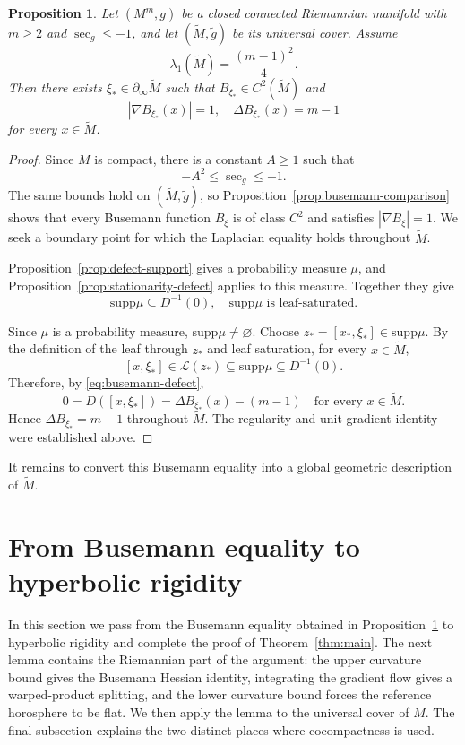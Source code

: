 \documentclass[12pt]{amsart}
\newtheorem{proposition}[theorem]{Proposition}
\theoremstyle{definition}
\numberwithin{equation}{section}
\newcommand{\mc}{\mathcal}
\newcommand{\wti}{\widetilde}
\newcommand{\supp}{\mathrm{supp}}
\begin{document}
\begin{proposition}
\label{prop:equality-busemann}
Let \((M^m,g)\) be a closed connected Riemannian manifold with \(m\geq2\)
and \(\sec_g\leq-1\), and let \((\wti M,\wti g)\) be its universal cover.
Assume
\[
  \lambda_1(\wti M)=\frac{(m-1)^2}{4}.
\]
Then there exists \(\xi_*\in\partial_\infty\wti M\) such that
\(B_{\xi_*}\in C^2(\wti M)\) and
\[
  |\nabla B_{\xi_*}(x)|=1,
  \quad
  \Delta B_{\xi_*}(x)=m-1
\]
for every \(x\in\wti M\).
\end{proposition}

\begin{proof}
Since \(M\) is compact, there is a constant \(A\geq1\) such that
\[
  -A^2\leq\sec_g\leq-1.
\]
The same bounds hold on \((\wti M,\wti g)\), so
Proposition~\ref{prop:busemann-comparison} shows that every Busemann
function \(B_\xi\) is of class \(C^2\) and satisfies
\(|\nabla B_\xi|=1\).  We seek a boundary point for which the Laplacian
equality holds throughout \(\wti M\).

Proposition~\ref{prop:defect-support} gives a probability measure
\(\mu\), and Proposition~\ref{prop:stationarity-defect} applies to this
measure.  Together they give
\[
  \supp\mu\subseteq D^{-1}(0),
  \quad
  \supp\mu\text{ is leaf-saturated}.
\]

Since \(\mu\) is a probability measure, \(\supp\mu\neq\varnothing\).
Choose \(z_*=[x_*,\xi_*]\in\supp\mu\).  By the definition of the leaf
through \(z_*\) and leaf saturation, for every \(x\in\wti M\),
\[
  [x,\xi_*]\in\mc L(z_*)
  \subseteq\supp\mu
  \subseteq D^{-1}(0).
\]
Therefore, by \eqref{eq:busemann-defect},
\[
  0=D([x,\xi_*])
   =\Delta B_{\xi_*}(x)-(m-1)
  \quad\text{for every }x\in\wti M.
\]
Hence \(\Delta B_{\xi_*}=m-1\) throughout \(\wti M\).  The regularity and
unit-gradient identity were established above.
\end{proof}

It remains to convert this Busemann equality into a global geometric
description of \(\wti M\).

\section{From Busemann equality to hyperbolic rigidity}
\label{sec:rigidity}

In this section we pass from the Busemann equality obtained in
Proposition~\ref{prop:equality-busemann} to hyperbolic rigidity and complete
the proof of Theorem~\ref{thm:main}.  The next lemma contains the
Riemannian part of the argument: the upper curvature bound gives the
Busemann Hessian identity, integrating the gradient flow gives a
warped-product splitting, and the lower curvature bound forces the
reference horosphere to be flat.  We then apply the lemma to the universal
cover of \(M\).  The final subsection explains the two distinct places
where cocompactness is used.
\end{document}
